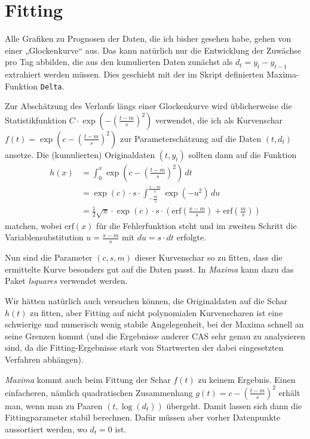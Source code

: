 \documentclass[a4paper,11pt]{article}
\newcommand{\br}[1]{\left(#1\right)}
\newcommand{\erf}{\mathrm{erf}}
\newcommand{\m}{\cdot}
\begin{document}
\section{Fitting}

Alle Grafiken zu Prognosen der Daten, die ich bisher gesehen habe, gehen von
einer „Glockenkurve“ aus.  Das kann natürlich nur die Entwicklung der Zuwächse
pro Tag abbilden, die aus den kumulierten Daten zunächst als $d_t=y_t-y_{t-1}$
extrahiert werden müssen. Dies geschieht mit der im Skript definierten
Maxima-Funktion \texttt{Delta}.

Zur Abschätzung des Verlaufs längs einer Glockenkurve wird üblicherweise die
Statistikfunktion $C\m\exp\br{-\br{\frac{t-m}{s}}^2}$ verwendet, die ich als
Kurvenschar $f(t)=\exp\br{c-\br{\frac{t-m}{s}}^2}$ zur Parameterschätzung auf
die Daten $(t,d_t)$ ansetze.  Die (kumulierten) Originaldaten $(t,y_t)$
sollten dann auf die Funktion
\begin{align*}
  h(x)&=\int_0^x{\exp\br{c-\br{\frac{t-m}{s}}^2}}\,dt\\ &=\exp(c)\m s\m
  \int_{-\frac{m}{s}}^{\frac{x-m}{s}}{\exp\br{-u^2}}\,du\\ &=\frac12 \sqrt{\pi}\m
  \exp(c)\m s\m \br{\erf\br{\frac{x-m}{s}}+ \erf\br{\frac{m}{s}}}
\end{align*}
matchen, wobei $\erf(x)$ für die Fehlerfunktion steht und im zweiten Schritt
die Variablensubstitution $u=\frac{x-m}{s}$ mit $du=s\m dt$ erfolgte.

Nun sind die Parameter $(c,s,m)$ dieser Kurvenschar so zu fitten, dass die
ermittelte Kurve besonders gut auf die Daten passt.  In \emph{Maxima} kann
dazu das Paket \emph{lsquares} verwendet werden.  

Wir hätten natürlich auch versuchen können, die Originaldaten auf die Schar
$h(t)$ zu fitten, aber Fitting auf nicht polynomialen Kurvenscharen ist eine
schwierige und numerisch wenig stabile Angelegenheit, bei der Maxima schnell
an seine Grenzen kommt (und die Ergebnisse anderer CAS sehr genau zu
analysieren sind, da die Fitting-Ergebnisse stark von Startwerten der dabei
eingesetzten Verfahren abhängen).

\emph{Maxima} kommt auch beim Fittung der Schar $f(t)$ zu keinem Ergebnis.
Einen einfacheren, nämlich quadratischen Zusammenhang
$g(t)=c-\br{\frac{t-m}{s}}^2$ erhält man, wenn man zu Paaren $(t,\log(d_t))$
übergeht.  Damit lassen sich dann die Fittingparameter stabil berechnen. Dafür
müssen aber vorher Datenpunkte aussortiert werden, wo $d_t=0$ ist.
\end{document}
